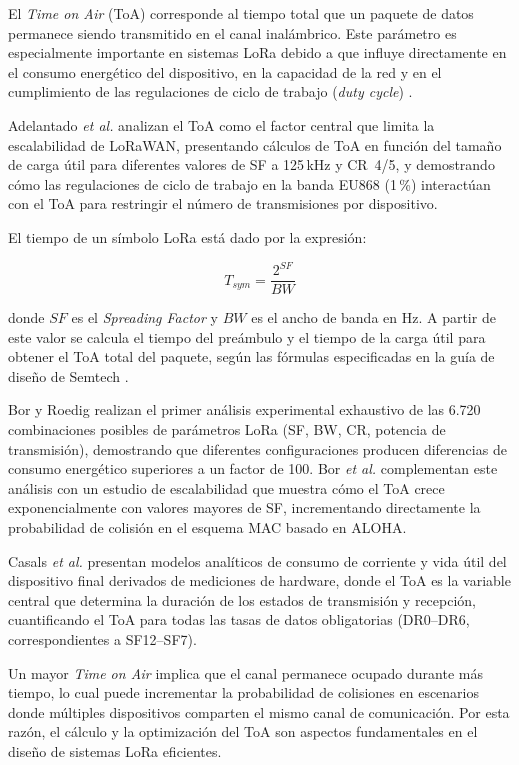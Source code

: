 El \textit{Time on Air} (ToA) corresponde al tiempo total que un paquete de datos permanece siendo transmitido en el canal inalámbrico. Este parámetro es especialmente importante en sistemas LoRa debido a que influye directamente en el consumo energético del dispositivo, en la capacidad de la red y en el cumplimiento de las regulaciones de ciclo de trabajo (\textit{duty cycle}) \cite{adelantado2017limits}.

Adelantado \textit{et al.} \cite{adelantado2017limits} analizan el ToA como el factor central que limita la escalabilidad de LoRaWAN, presentando cálculos de ToA en función del tamaño de carga útil para diferentes valores de SF a 125\,kHz y CR~4/5, y demostrando cómo las regulaciones de ciclo de trabajo en la banda EU868 (1\,\%) interactúan con el ToA para restringir el número de transmisiones por dispositivo.

El tiempo de un símbolo LoRa está dado por la expresión:

\begin{equation}
    T_{sym} = \frac{2^{SF}}{BW}
    \label{eq:tsym}
\end{equation}

\noindent donde $SF$ es el \textit{Spreading Factor} y $BW$ es el ancho de banda en Hz. A partir de este valor se calcula el tiempo del preámbulo y el tiempo de la carga útil para obtener el ToA total del paquete, según las fórmulas especificadas en la guía de diseño de Semtech \cite{semtech2013designer}.

Bor y Roedig \cite{bor2017parameter} realizan el primer análisis experimental exhaustivo de las 6.720 combinaciones posibles de parámetros LoRa (SF, BW, CR, potencia de transmisión), demostrando que diferentes configuraciones producen diferencias de consumo energético superiores a un factor de 100. Bor \textit{et al.} \cite{bor2016scale} complementan este análisis con un estudio de escalabilidad que muestra cómo el ToA crece exponencialmente con valores mayores de SF, incrementando directamente la probabilidad de colisión en el esquema MAC basado en ALOHA.

Casals \textit{et al.} \cite{casals2017energy} presentan modelos analíticos de consumo de corriente y vida útil del dispositivo final derivados de mediciones de hardware, donde el ToA es la variable central que determina la duración de los estados de transmisión y recepción, cuantificando el ToA para todas las tasas de datos obligatorias (DR0--DR6, correspondientes a SF12--SF7).

Un mayor \textit{Time on Air} implica que el canal permanece ocupado durante más tiempo, lo cual puede incrementar la probabilidad de colisiones en escenarios donde múltiples dispositivos comparten el mismo canal de comunicación. Por esta razón, el cálculo y la optimización del ToA son aspectos fundamentales en el diseño de sistemas LoRa eficientes.

